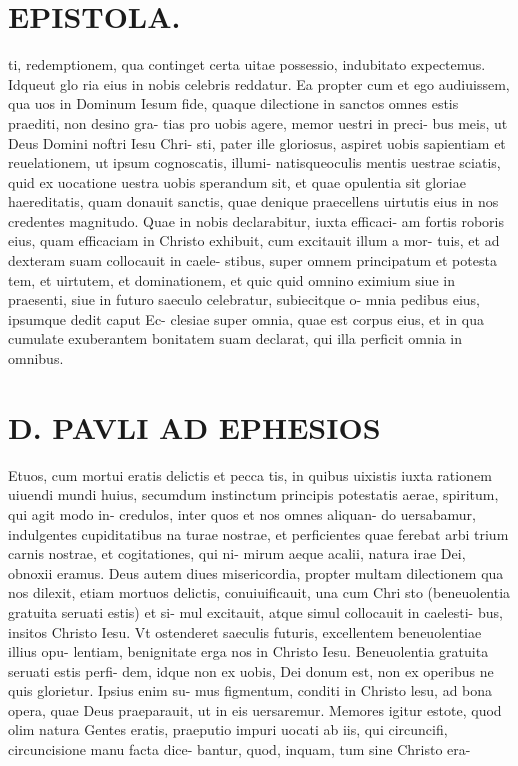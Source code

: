 \documentclass{article}
\begin{document}
\begin{pages}
\section*{EPISTOLA. }
\marginpar{[ p.90 ]}
\marginpar{[ p.91 ]}
\marginpar{[ p.92 ]}\pstart ti, redemptionem, qua continget certa uitae possessio, indubitato expectemus. Idqueut glo ria eius in nobis celebris reddatur.  \pend\pstart Ea propter cum et ego audiuissem, qua uos in Dominum Iesum fide, quaque dilectione in sanctos omnes estis praediti, non desino gra- tias pro uobis agere, memor uestri in preci- bus meis, ut Deus Domini noftri Iesu Chri- sti, pater ille gloriosus, aspiret uobis sapientiam et reuelationem, ut ipsum cognoscatis, illumi- natisqueoculis mentis uestrae sciatis, quid ex uocatione uestra uobis sperandum sit, et quae opulentia sit gloriae haereditatis, quam donauit sanctis, quae denique praecellens uirtutis eius in nos credentes magnitudo.  \pend\pstart Quae in nobis declarabitur, iuxta efficaci- am fortis roboris eius, quam efficaciam in Christo exhibuit, cum excitauit illum a mor- tuis, et ad dexteram suam collocauit in caele- stibus, super omnem principatum et potesta tem, et uirtutem, et dominationem, et quic quid omnino eximium siue in praesenti, siue in futuro saeculo celebratur, subiecitque o- mnia pedibus eius, ipsumque dedit caput Ec- clesiae super omnia, quae est corpus eius, et in qua cumulate exuberantem bonitatem suam declarat, qui illa perficit omnia in omnibus.  \pend
\section*{D. PAVLI AD EPHESIOS }
\marginpar{[ p.1. ]}
\marginpar{[ p.2. ]}
\marginpar{[ p.3. ]}
\marginpar{[ p.4. ]}\pstart Etuos, cum mortui eratis delictis et pecca tis, in quibus uixistis iuxta rationem uiuendi mundi huius, secumdum instinctum principis potestatis aerae, spiritum, qui agit modo in- credulos, inter quos et nos omnes aliquan- do uersabamur, indulgentes cupiditatibus na turae nostrae, et perficientes quae ferebat arbi trium carnis nostrae, et cogitationes, qui ni- mirum aeque acalii, natura irae Dei, obnoxii eramus.  \pend\pstart Deus autem diues misericordia, propter multam dilectionem qua nos dilexit, etiam mortuos delictis, conuiuificauit, una cum Chri sto (beneuolentia gratuita seruati estis) et si- mul excitauit, atque simul collocauit in caelesti- bus, insitos Christo Iesu. Vt ostenderet saeculis futuris, excellentem beneuolentiae illius opu- lentiam, benignitate erga nos in Christo Iesu.  \pend\pstart Beneuolentia gratuita seruati estis perfi- dem, idque non ex uobis, Dei donum est, non ex operibus ne quis glorietur. Ipsius enim su- mus figmentum, conditi in Christo lesu, ad bona opera, quae Deus praeparauit, ut in eis uersaremur.  \pend\pstart Memores igitur estote, quod olim natura Gentes eratis, praeputio impuri uocati ab iis, qui circuncifi, circuncisione manu facta dice- bantur, quod, inquam, tum sine Christo era-  \pend
\end{pages}
\end{document}
